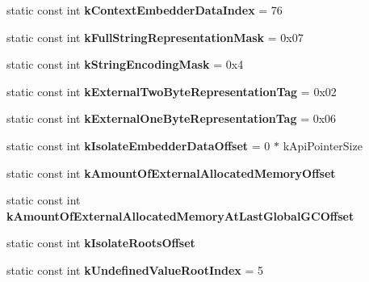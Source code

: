 \begin{DoxyCompactItemize}
\item 
\hypertarget{classv8_1_1internal_1_1Internals_afb65846499ec5f68172e4b2e8301a493}{}static const int {\bfseries k\+Context\+Embedder\+Data\+Index} = 76\label{classv8_1_1internal_1_1Internals_afb65846499ec5f68172e4b2e8301a493}

\item 
\hypertarget{classv8_1_1internal_1_1Internals_a5c39a86b30463928ea719def66916507}{}static const int {\bfseries k\+Full\+String\+Representation\+Mask} = 0x07\label{classv8_1_1internal_1_1Internals_a5c39a86b30463928ea719def66916507}

\item 
\hypertarget{classv8_1_1internal_1_1Internals_a1927ac3def13a57e03025e62ca46d1c5}{}static const int {\bfseries k\+String\+Encoding\+Mask} = 0x4\label{classv8_1_1internal_1_1Internals_a1927ac3def13a57e03025e62ca46d1c5}

\item 
\hypertarget{classv8_1_1internal_1_1Internals_a73faf917416d2519b65c7255e77a74ce}{}static const int {\bfseries k\+External\+Two\+Byte\+Representation\+Tag} = 0x02\label{classv8_1_1internal_1_1Internals_a73faf917416d2519b65c7255e77a74ce}

\item 
\hypertarget{classv8_1_1internal_1_1Internals_ac789a0a139ccbacec0c5fb2d79427305}{}static const int {\bfseries k\+External\+One\+Byte\+Representation\+Tag} = 0x06\label{classv8_1_1internal_1_1Internals_ac789a0a139ccbacec0c5fb2d79427305}

\item 
\hypertarget{classv8_1_1internal_1_1Internals_ad722bf4760df09958cd1062db4a5524c}{}static const int {\bfseries k\+Isolate\+Embedder\+Data\+Offset} = 0 $\ast$ k\+Api\+Pointer\+Size\label{classv8_1_1internal_1_1Internals_ad722bf4760df09958cd1062db4a5524c}

\item 
static const int {\bfseries k\+Amount\+Of\+External\+Allocated\+Memory\+Offset}
\item 
static const int {\bfseries k\+Amount\+Of\+External\+Allocated\+Memory\+At\+Last\+Global\+G\+C\+Offset}
\item 
static const int {\bfseries k\+Isolate\+Roots\+Offset}
\item 
\hypertarget{classv8_1_1internal_1_1Internals_a7281ff0eafed559e64613465b1a03296}{}static const int {\bfseries k\+Undefined\+Value\+Root\+Index} = 5\label{classv8_1_1internal_1_1Internals_a7281ff0eafed559e64613465b1a03296}


\end{DoxyCompactItemize}

